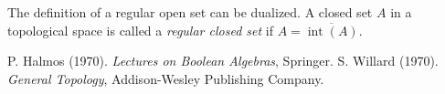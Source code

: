 \documentclass{article}
\begin{document}
The definition of a regular open set can be dualized.  A closed set $A$ in a topological space is called a \emph{regular closed set} if $A=\overline{\operatorname{int}(A)}$.

\begin{thebibliography}{[AHU]}
 P. Halmos (1970).  {\em{Lectures on Boolean Algebras}}, Springer.
 S. Willard (1970). \emph{General Topology}, Addison-Wesley Publishing Company.
\end{thebibliography}
\end{document}
